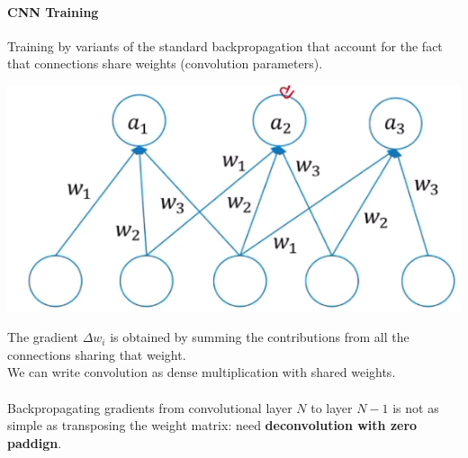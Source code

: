 \documentclass[10pt]{report}
\begin{document}
\paragraph{CNN Training}
Training by variants of the standard backpropagation that account for the fact that connections share weights (convolution parameters).
\begin{multicols}{2}
\begin{center}
	\includegraphics[scale=0.5]{62.png}
\end{center}
The gradient $\Delta w_i$ is obtained by summing the contributions from all the connections sharing that weight.\\
We can write convolution as dense multiplication with shared weights.\\\\
Backpropagating gradients from convolutional layer $N$ to layer $N-1$ is not as simple as transposing the weight matrix: need \textbf{deconvolution with zero paddign}.
\end{multicols}
\end{document}
